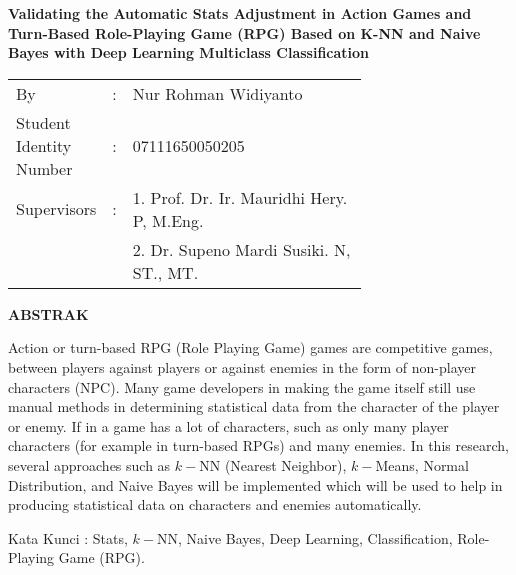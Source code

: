 \begin{spacing}{1}
	\begin{center}
		\Large\textbf{Validating the Automatic Stats Adjustment in Action Games and Turn-Based Role-Playing Game (RPG) Based on K-NN and Naive Bayes with Deep Learning Multiclass Classification}
	\end{center}
	\vspace{2ex}
	
	\begin{adjustwidth}{-0.2cm}{}
		\begin{tabular}{lcp{0.7\linewidth}}
			By &:& Nur Rohman Widiyanto \\
			Student Identity Number &:&	07111650050205 \\
			Supervisors &:& 1. Prof. Dr. Ir. Mauridhi Hery. P, M.Eng. \\
			& & 2. Dr. Supeno Mardi Susiki. N, ST., MT. \\
		\end{tabular}
	\end{adjustwidth}
	\vspace{2ex}
	
	\begin{center}
		\Large\textbf{ABSTRAK}
	\end{center}
	\vspace{1ex}
	
	Action or turn-based RPG (Role Playing Game) games are competitive games, between players against players or against enemies in the form of non-player characters (NPC). Many game developers in making the game itself still use manual methods in determining statistical data from the character of the player or enemy. If in a game has a lot of characters, such as only many player characters (for example in turn-based RPGs) and many enemies. In this research, several approaches such as $k-$NN (Nearest Neighbor), $k-$Means, Normal Distribution, and Naive Bayes will be implemented which will be used to help in producing statistical data on characters and enemies automatically.
	\vspace{2ex}

	Kata Kunci : Stats, $k-$NN, Naive Bayes, Deep Learning, Classification, Role-Playing Game (RPG).
\end{spacing}